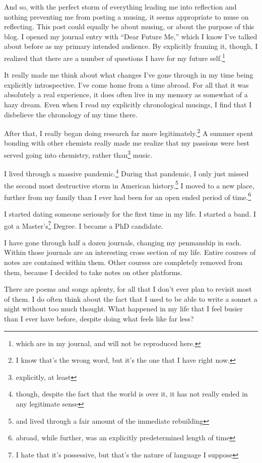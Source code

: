 \documentclass[12pt]{article}[titlepage]
\newcommand{\say}[1]{``#1''}
\renewcommand{\,}{\textsuperscript{,}}
\begin{document}
And so, with the perfect storm of everything leading me into reflection and nothing preventing me from posting a musing, it seems appropriate to muse on reflecting.
This post could equally be about musing, or about the purpose of this blog.
I opened my journal entry with \say{Dear Future Me,} which I know I've talked about before as my primary intended audience.
By explicitly framing it, though, I realized that there are a number of questions I have for my future self.\footnote{which are in my journal, and will not be reproduced here.}

It really made me think about what changes I've gone through in my time being explicitly introspective.
I've come home from a time abroad.
For all that it was absolutely a real experience, it does often live in my memory as somewhat of a hazy dream.
Even when I read my explicitly chronological musings, I find that I disbelieve the chronology of my time there.

After that, I really began doing research far more legitimately.\footnote{I know that's the wrong word, but it's the one that I have right now.}
A summer spent bonding with other chemists really made me realize that my passions were best served going into chemistry, rather than\footnote{explicitly, at least} music.

I lived through a massive pandemic.\footnote{though, despite the fact that the world is over it, it has not really ended in any legitimate sense}
During that pandemic, I only just missed the second most destructive storm in American history.\footnote{and lived through a fair amount of the immediate rebuilding}
I moved to a new place, further from my family than I ever had been for an open ended period of time.\footnote{abroad, while further, was an explicitly predetermined length of time}

I started dating someone seriously for the first time in my life.
I started a band.
I got a Master's\footnote{I hate that it's possessive, but that's the nature of language I suppose} Degree.
I became a PhD candidate.

I have gone through half a dozen journals, changing my penmanship in each.
Within those journals are an interesting cross section of my life.
Entire courses of notes are contained within them.
Other courses are completely removed from them, because I decided to take notes on other platforms.

There are poems and songs aplenty, for all that I don't ever plan to revisit most of them.
I do often think about the fact that I used to be able to write a sonnet a night without too much thought.
What happened in my life that I feel busier than I ever have before, despite doing what feels like far less?
\end{document}
